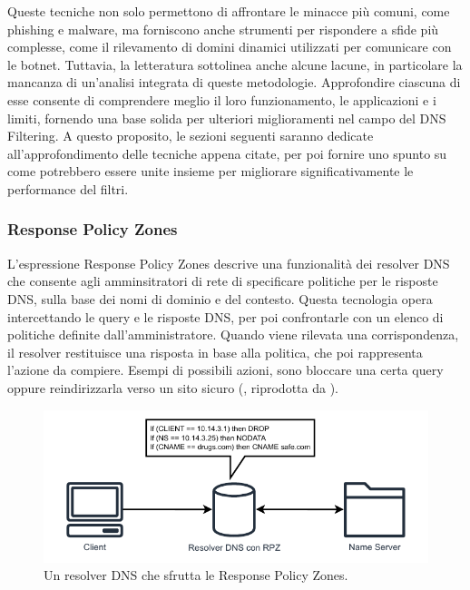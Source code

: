 Queste tecniche non solo permettono di affrontare le minacce più comuni, come phishing e malware, ma forniscono anche strumenti per rispondere a sfide più complesse, come il rilevamento di domini dinamici utilizzati per comunicare con le botnet. Tuttavia, la letteratura sottolinea anche alcune lacune, in particolare la mancanza di un'analisi integrata di queste metodologie. Approfondire ciascuna di esse consente di comprendere meglio il loro funzionamento, le applicazioni e i limiti, fornendo una base solida per ulteriori miglioramenti nel campo del DNS Filtering. A questo proposito, le sezioni seguenti saranno dedicate all'approfondimento delle tecniche appena citate, per poi fornire uno spunto su come potrebbero essere unite insieme per migliorare significativamente le performance del filtri.

\subsubsection{Response Policy Zones}
L'espressione Response Policy Zones descrive una funzionalità dei resolver DNS che consente agli amminsitratori di rete di specificare politiche per le risposte DNS, sulla base dei nomi di dominio e del contesto. Questa tecnologia opera intercettando le query e le risposte DNS, per poi confrontarle con un elenco di politiche definite dall'amministratore. Quando viene rilevata una corrispondenza, il resolver restituisce una risposta in base alla politica, che poi rappresenta l'azione da compiere. Esempi di possibili azioni, sono bloccare una certa query oppure reindirizzarla verso un sito sicuro (, riprodotta da \cite{DBLP:journals/corr/abs-2401-03864}).

\begin{figure}
  \centering
  \includegraphics[width=1.0\linewidth]{figures/Response_Policy_zones.pdf}
  \caption{Un resolver DNS che sfrutta le Response Policy Zones.}
  \label{fig:rpz}
\end{figure}


